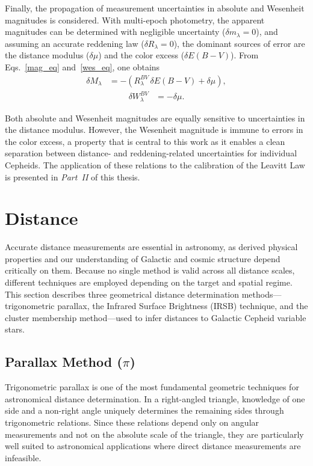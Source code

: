 Finally, the propagation of measurement uncertainties in absolute and Wesenheit magnitudes is considered. With multi-epoch photometry, the apparent magnitudes can be determined with negligible uncertainty ($\delta m_\lambda = 0$), and assuming an accurate reddening law ($\delta R_\lambda = 0$), the dominant sources of error are the distance modulus ($\delta \mu$) and the color excess ($\delta E(B-V)$). From Eqs.~\eqref{mag_eq} and~\eqref{wes_eq}, one obtains
\begin{align}\label{mag_error}
\delta M_\lambda &= -\left(R_\lambda^{BV}\,\delta E(B-V) + \delta \mu\right),
\end{align}
\begin{align}\label{wesen_error}
\delta W_\lambda^{BV} &= -\delta \mu.
\end{align}

Both absolute and Wesenheit magnitudes are equally sensitive to uncertainties in the distance modulus. However, the Wesenheit magnitude is immune to errors in the color excess, a property that is central to this work as it enables a clean separation between distance- and reddening-related uncertainties for individual Cepheids. The application of these relations to the calibration of the Leavitt Law is presented in \textit{Part~II} of this thesis.

\section{Distance}

Accurate distance measurements are essential in astronomy, as derived physical properties and our understanding of Galactic and cosmic structure depend critically on them. Because no single method is valid across all distance scales, different techniques are employed depending on the target and spatial regime. This section describes three geometrical distance determination methods—trigonometric parallax, the Infrared Surface Brightness (IRSB) technique, and the cluster membership method—used to infer distances to Galactic Cepheid variable stars. 

\subsection{Parallax Method ($\pi$)}


Trigonometric parallax is one of the most fundamental geometric techniques for astronomical distance determination. In a right-angled triangle, knowledge of one side and a non-right angle uniquely determines the remaining sides through trigonometric relations. Since these relations depend only on angular measurements and not on the absolute scale of the triangle, they are particularly well suited to astronomical applications where direct distance measurements are infeasible.

